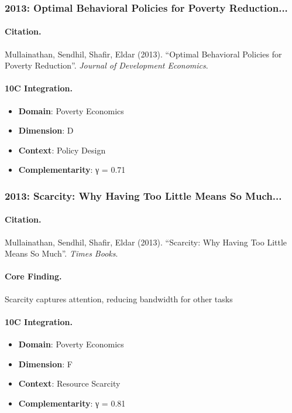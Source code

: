 \subsubsection{2013: Optimal Behavioral Policies for Poverty Reduction...}

\paragraph{Citation.}
Mullainathan, Sendhil, Shafir, Eldar (2013). ``Optimal Behavioral Policies for Poverty Reduction''. \textit{Journal of Development Economics}.

\paragraph{10C Integration.}
\begin{itemize}[nosep]
  \item \textbf{Domain}: Poverty Economics
  \item \textbf{Dimension}: D
  \item \textbf{Context}: Policy Design
  \item \textbf{Complementarity}: γ = 0.71
\end{itemize}


\subsubsection{2013: Scarcity: Why Having Too Little Means So Much...}

\paragraph{Citation.}
Mullainathan, Sendhil, Shafir, Eldar (2013). ``Scarcity: Why Having Too Little Means So Much''. \textit{Times Books}.

\paragraph{Core Finding.}
Scarcity captures attention, reducing bandwidth for other tasks

\paragraph{10C Integration.}
\begin{itemize}[nosep]
  \item \textbf{Domain}: Poverty Economics
  \item \textbf{Dimension}: F
  \item \textbf{Context}: Resource Scarcity
  \item \textbf{Complementarity}: γ = 0.81
\end{itemize}


